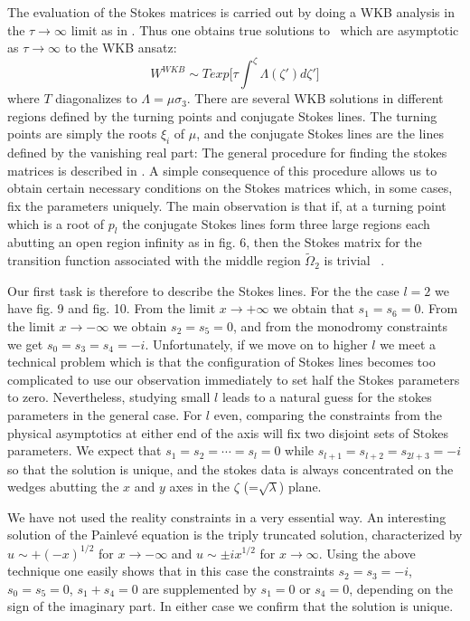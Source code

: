 The evaluation of the Stokes matrices is carried out by doing 
a WKB analysis in the $\tau\to\infty$ limit as in \Its . Thus one 
obtains true solutions to \limeqt\ which are asymptotic as
$\tau\to\infty$ to the WKB ansatz:
$$ W^{WKB}\sim
T exp\Biggl[\tau\int^\zeta\Lambda(\zeta')d\zeta'
\Biggr]
$$
where $T$ diagonalizes \limeqt to $\Lambda=\mu\sigma_3$. 
There are several WKB solutions in different regions defined by 
the turning points and conjugate Stokes lines. The turning 
points are simply the roots $\xi_i$ of $\mu$, and the  
conjugate Stokes lines are the lines defined by the vanishing real 
part:
\eqn{}
The general procedure for finding the stokes matrices is described in 
\Its . A simple consequence of this procedure allows us to 
obtain certain necessary conditions on 
the Stokes matrices which, in some cases, fix the parameters 
uniquely. The main observation is that
if, at a turning point 
which is a root of $p_l$ the conjugate Stokes lines form three large 
regions each abutting an open region infinity as in fig. 6,
then the Stokes matrix for the transition function associated with the middle 
region $\tilde \Omega_2$ is trivial \geom\ .

Our first task is therefore to describe the Stokes lines.
For the the case $l=2$ we have fig. 9 and fig. 10. 
From the limit $x\to +\infty$ we obtain that $s_1=s_6=0$. 
From the limit $x\to -\infty$ we obtain $s_2=s_5=0$, and 
from the monodromy constraints we get
$s_0=s_3=s_4=-i$.
Unfortunately,
if we move on to higher $l$ we meet a technical problem 
which is that the configuration of Stokes lines becomes
too complicated to use our observation immediately to set 
half the Stokes parameters to zero. 
Nevertheless, studying small $l$ leads to a 
natural guess for the stokes parameters in 
the general case. For 
$l$ even, comparing the constraints from the 
physical asymptotics
at either end 
of the axis will fix two disjoint sets of Stokes
parameters. We expect that $s_1=s_2=\cdots =s_l=0$
while $s_{l+1}=s_{l+2}=s_{2l+3}=-i$ so that the solution 
is unique, and the stokes data is always concentrated on 
the wedges abutting the $x$ and $y$ axes in the 
$\zeta$ (=$\sqrt{\lambda}$) plane.

We have not used the reality 
constraints in a very essential way. An interesting 
solution of the Painlev\'e equation is the triply truncated
solution, characterized by $u\sim +(-x)^{1/2}$ for 
$x\to-\infty$ and $u\sim\pm i x^{1/2}$ for $x\to \infty$. 
Using the above technique one easily shows that in this
case the constraints $s_2=s_3=-i$, $s_0=s_5=0$, 
$s_1+s_4=0$ are supplemented by $s_1=0$ or $s_4=0$, 
depending on the sign of the imaginary part. In either
case we confirm that the solution is unique.

